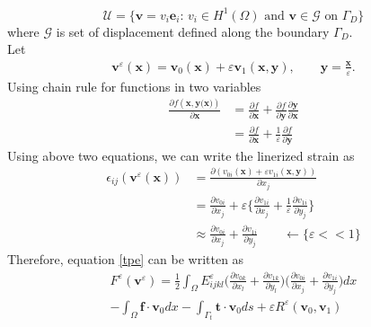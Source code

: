 \documentclass[10pt]{article}
\begin{document}
\begin{equation}
\mathcal{U} = \{\textbf{v} = v_i\textbf{e}_i :\, v_i\in H^1(\Omega) \text{ and } \textbf{v}\in\mathcal{G} \text{ on } \Gamma_D\}
\end{equation}
where $\mathcal{G}$ is set of displacement defined along the boundary $\Gamma_D$.\\
Let 
\begin{align}
\textbf{v}^\varepsilon(\textbf{x}) = \textbf{v}_0(\textbf{x})+\varepsilon\textbf{v}_1(\textbf{x},\textbf{y}),\qquad \textbf{y}=\frac{\textbf{x}}{\varepsilon}.
\end{align}
Using chain rule for functions in two variables\\
\begin{equation}
\begin{split}
\frac{\partial f(\textbf{x}, \textbf{y(x)})}{\partial \textbf{x}} &= \frac{\partial f}{\partial \textbf{x}}+\frac{\partial f}{\partial \textbf{y}}\frac{\partial \textbf{y}}{\partial \textbf{x}}\\
&=\frac{\partial f}{\partial \textbf{x}}+\frac{1}{\varepsilon}\frac{\partial f}{\partial \textbf{y}}
\end{split}
\end{equation}
Using above two equations, we can write the linerized strain as
\begin{equation}
\begin{split}
\epsilon_{ij}(\textbf{v}^\varepsilon(\textbf{x})) &= \frac{\partial (v_{0i}(\textbf{x})+\varepsilon v_{1i}(\textbf{x},\textbf{y}))}{\partial x_j}\\
&=\frac{\partial v_{0i}}{\partial x_j}+\varepsilon\bigg\{\frac{\partial v_{1i}}{\partial x_j}+\frac{1}{\varepsilon}\frac{\partial v_{1i}}{\partial y_j}\bigg\}\\
&\approx \frac{\partial v_{0i}}{\partial x_j}+\frac{\partial v_{1i}}{\partial y_j} \qquad \leftarrow \{ \varepsilon << 1\}
\end{split}
\end{equation}
Therefore, equation \eqref{tpe} can be written as 
\begin{multline}
F^\varepsilon(\textbf{v}^\varepsilon) = \frac{1}{2}\int_\Omega E^\varepsilon_{ijkl}\bigg (\frac{\partial v_{0k}}{\partial x_l}+\frac{\partial v_{1k}}{\partial y_l}\bigg )\bigg (\frac{\partial v_{0i}}{\partial x_j}+\frac{\partial v_{1i}}{\partial y_j}\bigg )dx\\
-\int_\Omega\textbf{f}\cdot\textbf{v}_0 dx - \int_{\Gamma_t}\textbf{t}\cdot\textbf{v}_0 ds + \varepsilon R^\varepsilon(\textbf{v}_0, \textbf{v}_1)
\end{multline}
\end{document}
